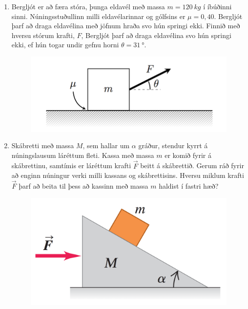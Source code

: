 \ifdefined \wholebook \else\documentclass[oneside]{book}\usepackage{EdlBook}\graphicspath{{figures/}}
\begin{document}
\begin{enumerate}[label = \textbf{Dæmi \thechapter.\arabic*.}]
\item Bergljót er að færa stóra, þunga eldavél með massa $m = \SI{120}{kg}$ í íbúðinni sinni. Núningsstuðullinn milli eldavélarinnar og gólfsins er $\mu = 0,40$. Bergljót þarf að draga eldavélina með jöfnum hraða svo hún springi ekki. Finnið með hversu stórum krafti, $F$, Bergljót þarf að draga eldavélina svo hún springi ekki, ef hún togar undir gefnu horni $\theta = \SI{31}{\degree}$.

\begin{figure}[H]
    \centering
    \includegraphics[scale = 0.5]{images/kommoda.png}
\end{figure}

\vspace{-0.5cm}

\item Skábretti með massa $M$, sem hallar um $\alpha$ gráður, stendur kyrrt á núningslausum láréttum fleti. Kassa með massa $m$ er komið fyrir á skábrettinu, samtímis er láréttum krafti $\Vec{F}$ beitt á skábrettið. Gerum ráð fyrir að enginn núningur verki milli kassans og skábrettisins. Hversu miklum krafti $\Vec{F}$ þarf að beita til þess að kassinn með massa $m$ haldist í fastri hæð?

\begin{figure}[H]
    \centering
    \includegraphics[scale = 0.3]{images/martrod.png}
\end{figure}


\end{enumerate}
\end{document}
